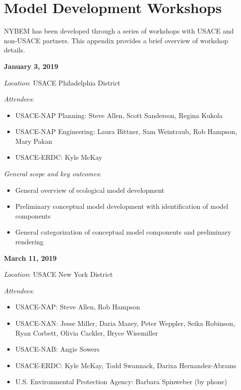 \documentclass[
]{book}
\providecommand{\tightlist}{%
  \setlength{\itemsep}{0pt}\setlength{\parskip}{0pt}}
\begin{document}
\hypertarget{model-development-workshops}{%
\chapter{Model Development Workshops}\label{model-development-workshops}}

NYBEM has been developed through a series of workshops with USACE and non-USACE partners. This appendix provides a brief overview of workshop details.

\textbf{January 3, 2019}

\emph{Location}: USACE Philadelphia District

\emph{Attendees}:

\begin{itemize}
\tightlist
\item
  USACE-NAP Planning: Steve Allen, Scott Sanderson, Regina Kukola\\
\item
  USACE-NAP Engineering: Laura Bittner, Sam Weintraub, Rob Hampson, Mary Pakan\\
\item
  USACE-ERDC: Kyle McKay
\end{itemize}

\emph{General scope and key outcomes}:

\begin{itemize}
\tightlist
\item
  General overview of ecological model development\\
\item
  Preliminary conceptual model development with identification of model components\\
\item
  General categorization of conceptual model components and preliminary rendering
\end{itemize}

\textbf{March 11, 2019}

\emph{Location}: USACE New York District

\emph{Attendees}:

\begin{itemize}
\tightlist
\item
  USACE-NAP: Steve Allen, Rob Hampson\\
\item
  USACE-NAN: Jesse Miller, Daria Mazey, Peter Weppler, Seika Robinson, Ryan Corbett, Olivia Cackler, Bryce Wisemiller\\
\item
  USACE-NAB: Angie Sowers\\
\item
  USACE-ERDC: Kyle McKay, Todd Swannack, Darixa Hernandez-Abrams\\
\item
  U.S. Environmental Protection Agency: Barbara Spinweber (by phone)
\end{itemize}
\end{document}
